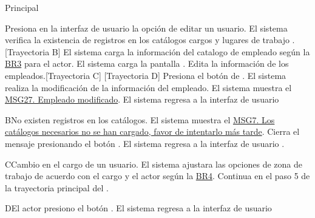 \begin{UCtrayectoria}{Principal}
    
    \UCpaso[\UCactor] Presiona en la interfaz de usuario  la opción de editar un usuario. 
    \UCpaso  El sistema verifica la existencia de registros en los catálogos cargos  y  lugares de trabajo . [Trayectoria B] 
    \UCpaso El sistema carga la información del catalogo de empleado  según la \hyperlink{reglas-BR3}{BR3} para el actor.
    \UCpaso El sistema carga la pantalla  .
    \UCpaso[\UCactor] Edita la información de los empleados.[Trayectoria C] [Trayectoria D] 
    \UCpaso[\UCactor]  Presiona el botón de .
    \UCpaso El sistema realiza la modificación de la información del empleado.
    \UCpaso  El sistema muestra el \hyperref[MSG27]{MSG27. Empleado modificado}.    
    \UCpaso El sistema regresa a la interfaz de usuario 
\end{UCtrayectoria}

\begin{UCtrayectoriaA}{B}{No existen registros en los catálogos.}
    \UCpaso     El sistema muestra el \hyperref[MSG7]{MSG7. Los catálogos necesarios no se han cargado, favor de intentarlo más tarde}.
    \UCpaso[\UCactor] Cierra el mensaje presionando el botón .
    \UCpaso El sistema regresa a la interfaz de usuario .
\end{UCtrayectoriaA}

\begin{UCtrayectoriaA}{C}{Cambio en el cargo de un usuario.}
    \UCpaso     El sistema ajustara las opciones de zona de trabajo de acuerdo con el cargo y el actor según la \hyperlink{reglas-BR4}{BR4}.
    \UCpaso     Continua en el paso 5 de la trayectoria principal del .
\end{UCtrayectoriaA}

\begin{UCtrayectoriaA}{D}{El actor presiono el botón .}
 \UCpaso El sistema regresa a la interfaz de usuario 
\end{UCtrayectoriaA}
